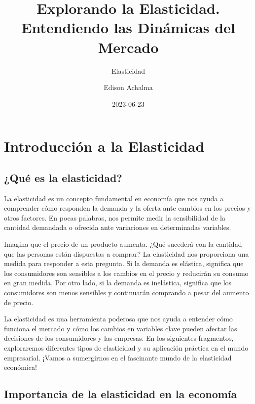 \documentclass[
  a4paper,
]{article}
\title{Explorando la Elasticidad. Entendiendo las Dinámicas del Mercado}
\subtitle{Elasticidad}
\author{Edison Achalma}
\date{2023-06-23}
\begin{document}
\maketitle
\ifdefined\Shaded\renewenvironment{Shaded}{\begin{tcolorbox}[enhanced, frame hidden, interior hidden, boxrule=0pt, borderline west={3pt}{0pt}{shadecolor}, breakable, sharp corners]}{\end{tcolorbox}}\fi

\hypertarget{introducciuxf3n-a-la-elasticidad}{%
\section{Introducción a la
Elasticidad}\label{introducciuxf3n-a-la-elasticidad}}

\hypertarget{quuxe9-es-la-elasticidad}{%
\subsection{¿Qué es la elasticidad?}\label{quuxe9-es-la-elasticidad}}

La elasticidad es un concepto fundamental en economía que nos ayuda a
comprender cómo responden la demanda y la oferta ante cambios en los
precios y otros factores. En pocas palabras, nos permite medir la
sensibilidad de la cantidad demandada o ofrecida ante variaciones en
determinadas variables.

Imagina que el precio de un producto aumenta. ¿Qué sucederá con la
cantidad que las personas están dispuestas a comprar? La elasticidad nos
proporciona una medida para responder a esta pregunta. Si la demanda es
elástica, significa que los consumidores son sensibles a los cambios en
el precio y reducirán su consumo en gran medida. Por otro lado, si la
demanda es inelástica, significa que los consumidores son menos
sensibles y continuarán comprando a pesar del aumento de precio.

La elasticidad es una herramienta poderosa que nos ayuda a entender cómo
funciona el mercado y cómo los cambios en variables clave pueden afectar
las decisiones de los consumidores y las empresas. En los siguientes
fragmentos, exploraremos diferentes tipos de elasticidad y su aplicación
práctica en el mundo empresarial. ¡Vamos a sumergirnos en el fascinante
mundo de la elasticidad económica!

\hypertarget{importancia-de-la-elasticidad-en-la-economuxeda}{%
\subsection{Importancia de la elasticidad en la
economía}\label{importancia-de-la-elasticidad-en-la-economuxeda}}
\end{document}
